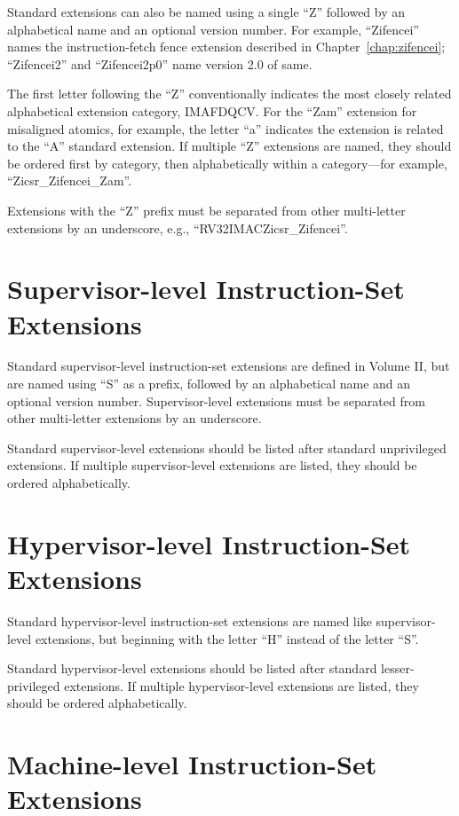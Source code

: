 Standard extensions can also be named using a single ``Z'' followed by an
alphabetical name and an optional version number.  For example,
``Zifencei'' names the instruction-fetch fence extension described in
Chapter~\ref{chap:zifencei}; ``Zifencei2'' and ``Zifencei2p0'' name version
2.0 of same.

The first letter following the ``Z'' conventionally indicates the most closely
related alphabetical extension category, IMAFDQCV.  For the ``Zam''
extension for misaligned atomics, for example, the letter ``a'' indicates the
extension is related to the ``A'' standard extension.  If multiple ``Z''
extensions are named, they should be ordered first by category, then
alphabetically within a category---for example, ``Zicsr\_Zifencei\_Zam''.

Extensions with the ``Z'' prefix must be separated
from other multi-letter extensions by an underscore, e.g.,
``RV32IMACZicsr\_Zifencei''.

\section{Supervisor-level Instruction-Set Extensions}

Standard supervisor-level instruction-set extensions are defined in Volume II,
but are named using ``S'' as a prefix, followed by an alphabetical name and an
optional version number.  Supervisor-level extensions must be separated from
other multi-letter extensions by an underscore.

Standard supervisor-level extensions should be listed after standard
unprivileged extensions.  If multiple supervisor-level extensions are listed,
they should be ordered alphabetically.

\section{Hypervisor-level Instruction-Set Extensions}

Standard hypervisor-level instruction-set extensions are named like
supervisor-level extensions, but beginning with the letter ``H'' instead of
the letter ``S''.

Standard hypervisor-level extensions should be listed after standard
lesser-privileged extensions.  If multiple hypervisor-level extensions are
listed, they should be ordered alphabetically.

\section{Machine-level Instruction-Set Extensions}

